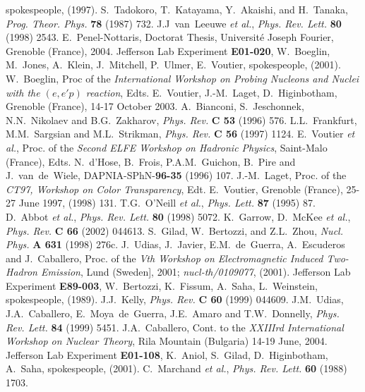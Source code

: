 \documentclass{elsart}
\begin{document}
\begin{thebibliography}{99}
spokespeople, (1997).
%
S.~Tadokoro, T.~Katayama, Y.~Akaishi, and H.~Tanaka, {\it Prog. Theor. Phys.} 
{\bf 78} (1987) 732.
%
J.J~van~Leeuwe {\it et al.}, {\it Phys. Rev. Lett.} {\bf 80} (1998) 2543. 
%
E.~Penel-Nottaris, Doctorat Thesis, Universit\'e Joseph Fourier, Grenoble
(France), 2004.
%
Jefferson Lab Experiment {\bf E01-020}, W.~Boeglin, M.~Jones, A.~Klein, 
J.~Mitchell, P.~Ulmer, E.~Voutier, spokespeople, (2001).
%
W.~Boeglin, Proc of the {\it International Workshop on Probing Nucleons and Nuclei 
with the $(e,e'p)$ reaction}, Edts. E.~Voutier, J.-M.~Laget, D.~Higinbotham, 
Grenoble (France), 14-17 October 2003.
%
A.~Bianconi, S.~Jeschonnek, N.N.~Nikolaev and B.G.~Zakharov, {\it Phys. Rev.} 
{\bf C 53} (1996) 576.
%
L.L.~Frankfurt, M.M.~Sargsian and M.L.~Strikman, {\it Phys. Rev.} {\bf C 56}
(1997) 1124.
%
E.~Voutier {\it et al.}, Proc. of the {\it Second ELFE Workshop 
on Hadronic Physics}, Saint-Malo (France), Edts. N.~d'Hose, B.~Frois, 
P.A.M.~Guichon, B.~Pire and J.~van~de~Wiele, DAPNIA-SPhN-{\bf 96-35} (1996) 
107.
%
J.-M.~Laget, Proc. of the {\it CT97, Workshop on Color Transparency}, Edt. 
E.~Voutier, Grenoble (France), 25-27 June 1997, (1998) 131.
%
T.G.~O'Neill {\it et al.}, {\it Phys. Lett.} {\bf 87} (1995) 87.
%
D.~Abbot {\it et al.}, {\it Phys. Rev. Lett.} {\bf 80} (1998) 5072.
%
K.~Garrow, D.~McKee {\it et al.}, {\it Phys. Rev.} {\bf C 66} (2002) 044613.
%
S.~Gilad, W.~Bertozzi, and  Z.L.~Zhou, {\it Nucl. Phys.} {\bf A 631} (1998) 
276c.
%
J.~Udias, J.~Javier, E.M.~de~Guerra, A.~Escuderos and J.~Caballero, Proc. of the 
{\it Vth Workshop on Electromagnetic Induced Two-Hadron Emission}, Lund (Sweden], 
2001; {\it nucl-th/0109077}, (2001). 
%
Jefferson Lab Experiment {\bf E89-003}, W.~Bertozzi, K.~Fissum, A.~Saha, 
L.~Weinstein, spokespeople, (1989).
%
J.J.~Kelly, {\it Phys. Rev.} {\bf C 60} (1999) 044609.
%
J.M.~Udias, J.A.~Caballero, E.~Moya~de~Guerra, J.E.~Amaro and T.W.~Donnelly, 
{\it Phys. Rev. Lett.} {\bf 84} (1999) 5451.
%
J.A.~Caballero, Cont. to the {\it XXIIIrd International Workshop on Nuclear 
Theory}, Rila Mountain (Bulgaria) 14-19 June, 2004.
%
Jefferson Lab Experiment {\bf E01-108}, K.~Aniol, S.~Gilad, D.~Higinbotham, 
A.~Saha, spokespeople, (2001).
%
C.~Marchand {\it et al.}, {\it Phys. Rev. Lett.} {\bf 60} (1988) 1703.

\end{thebibliography}
\end{document}
